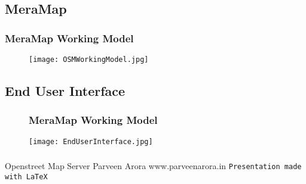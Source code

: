 \documentclass{beamer}
\begin{document}
\newpage
\subsection{MeraMap}
\frametitle{MeraMap Working Model} 
\begin{figure}
\label{imag}
\centering
\texttt{[image: OSMWorkingModel.jpg]}
\end{figure}

\newpage
\subsection{End User Interface}
\begin{figure}
\frametitle{MeraMap Working Model}
\label{imag}
\centering
\texttt{[image: EndUserInterface.jpg]}
\end{figure}



\begin{frame}
 \frametitle{}
  \centering \emph{\bfseries \textbf{}} \linebreak
  \linebreak
  \linebreak
  Openstreet Map Server \linebreak
  Parveen Arora \linebreak
  www.parveenarora.in \linebreak 
  \linebreak
  \texttt{Presentation made with \LaTeX{}}
  
\end{frame}
\end{document}
